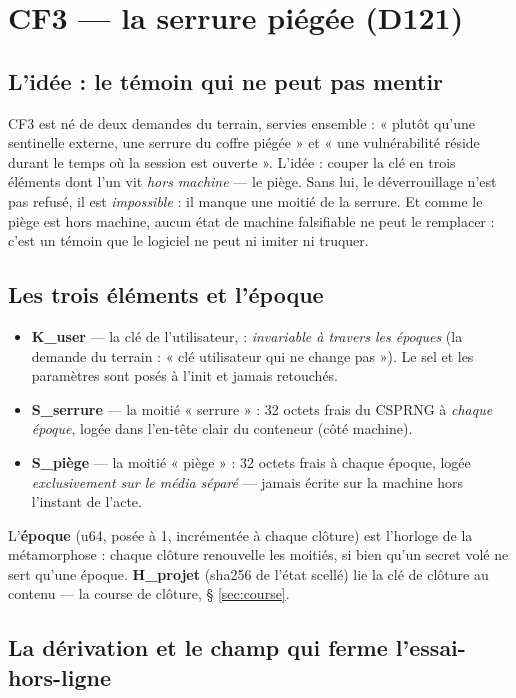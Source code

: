 \section{CF3 — la serrure piégée (D121)}\label{sec:cf3}

\subsection{L'idée : le témoin qui ne peut pas mentir}

CF3 est né de deux demandes du terrain, servies ensemble : « plutôt qu'une sentinelle
externe, une serrure du coffre piégée » et « une vulnérabilité réside durant le temps
où la session est ouverte ». L'idée : couper la clé en trois éléments dont l'un vit
\emph{hors machine} — le piège. Sans lui, le déverrouillage n'est pas refusé, il est
\emph{impossible} : il manque une moitié de la serrure. Et comme le piège est hors
machine, aucun état de machine falsifiable ne peut le remplacer : c'est un témoin que
le logiciel ne peut ni imiter ni truquer.

\subsection{Les trois éléments et l'époque}

\begin{itemize}
\item \textbf{K\_user} — la clé de l'utilisateur,  : \emph{invariable à travers les époques} (la demande du terrain : « clé
utilisateur qui ne change pas »). Le sel et les paramètres sont posés à l'init et
jamais retouchés.
\item \textbf{S\_serrure} — la moitié « serrure » : 32 octets frais du CSPRNG à
\emph{chaque époque}, logée dans l'en-tête clair du conteneur (côté machine).
\item \textbf{S\_piège} — la moitié « piège » : 32 octets frais à chaque époque,
logée \emph{exclusivement sur le média séparé} — jamais écrite sur la machine hors
l'instant de l'acte.
\end{itemize}

L'\textbf{époque} (u64, posée à 1, incrémentée à chaque clôture) est l'horloge de la
métamorphose : chaque clôture renouvelle les moitiés, si bien qu'un secret volé ne
sert qu'une époque. \textbf{H\_projet} (sha256 de l'état scellé) lie la clé de clôture
au contenu — la course de clôture, § \ref{sec:course}.

\subsection{La dérivation et le champ qui ferme l'essai-hors-ligne}

